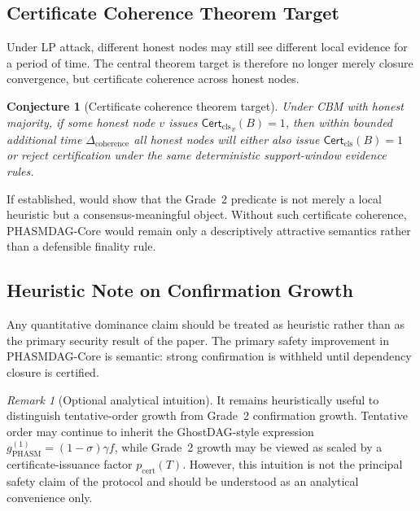 \documentclass[11pt]{article}
\theoremstyle{definition}
\theoremstyle{plain}
\newtheorem{conjecture}[definition]{Conjecture}
\theoremstyle{remark}
\newtheorem{remark}[definition]{Remark}
\newcommand{\Certcls}{\mathsf{Cert}_{\mathrm{cls}}}
\begin{document}
\subsection{Certificate Coherence Theorem Target}

Under LP attack, different honest nodes may still see different local evidence
for a period of time.
The central theorem target is therefore no longer merely closure convergence,
but certificate coherence across honest nodes.

\begin{conjecture}[Certificate coherence theorem target]\label{conj:coherence}
Under CBM with honest majority, if some honest node $v$ issues
${\Certcls}_v(B)=1$, then within bounded additional time
$\Delta_{\mathrm{coherence}}$ all honest nodes will either also issue
${\Certcls}(B)=1$ or reject certification under the same deterministic
support-window evidence rules.
\end{conjecture}

\noindent If established,  would show that the Grade~2
predicate is not merely a local heuristic but a consensus-meaningful object.
Without such certificate coherence, PHASMDAG-Core would remain only a
descriptively attractive semantics rather than a defensible finality rule.

\subsection{Heuristic Note on Confirmation Growth}

Any quantitative dominance claim should be treated as heuristic rather than as
the primary security result of the paper.
The primary safety improvement in PHASMDAG-Core is semantic:
strong confirmation is withheld until dependency closure is certified.

\begin{remark}[Optional analytical intuition]\label{rem:gamma_heuristic}
It remains heuristically useful to distinguish tentative-order growth from
Grade~2 confirmation growth.
Tentative order may continue to inherit the GhostDAG-style expression
$g^{(1)}_{\mathrm{PHASM}}=(1-\sigma)\gamma f$, while Grade~2 growth may be
viewed as scaled by a certificate-issuance factor $p_{\mathrm{cert}}(T)$.
However, this intuition is not the principal safety claim of the protocol and
should be understood as an analytical convenience only.
\end{remark}

\end{document}
